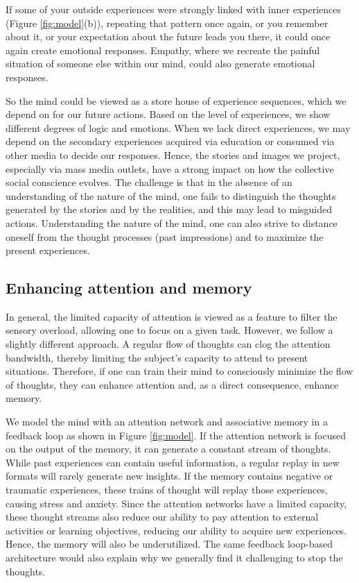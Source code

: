 \documentclass[reprint,amsmath,amssymb,apr,aip,onecolumn, 11pt]{revtex4-1}
\begin{document}
If some of your outside experiences were strongly linked with inner experiences (Figure \ref{fig:model}(b)), repeating that pattern once again, or you remember about it, or your expectation about the future leads you there, it could once again create emotional responses. Empathy, where we recreate the painful situation of someone else within our mind, could also generate emotional responses. 

So the mind could be viewed as a store house of experience sequences, which we depend on for our future actions. Based on the level of experiences, we show different degrees of logic and emotions. When we lack direct experiences, we may depend on the secondary experiences acquired via education or consumed via other media to decide our responses. Hence, the stories and images we project, especially via mass media outlets, have a strong impact on how the collective social conscience evolves. The challenge is that in the absence of an understanding of the nature of the mind, one fails to distinguish the thoughts generated by the stories and by the realities, and this may lead to misguided actions. Understanding the nature of the mind, one can also strive to distance oneself from the thought processes (past impressions) and to maximize the present experiences. 


\subsection{Enhancing attention and memory}

In general, the limited capacity of attention is viewed as a feature to filter the sensory overload, allowing one to focus on a given task. However, we follow a slightly different approach. A regular flow of thoughts can clog the attention bandwidth, thereby limiting the subject's capacity to attend to present situations. Therefore, if one can train their mind to consciously minimize the flow of thoughts, they can enhance attention and, as a direct consequence, enhance memory.  

We model the mind with an attention network and associative memory in a feedback loop as shown in Figure \ref{fig:model}. If the attention network is focused on the output of the memory, it can generate a constant stream of thoughts. While past experiences can contain useful information, a regular replay in new formats will rarely generate new insights. If the memory contains negative or traumatic experiences, these trains of thought will replay those experiences, causing stress and anxiety. Since the attention networks have a limited capacity, these thought streams also reduce our ability to pay attention to external activities or learning objectives, reducing our ability to acquire new experiences. Hence, the memory will also be underutilized. The same feedback loop-based architecture would also explain why we generally find it challenging to stop the thoughts. 
\end{document}
